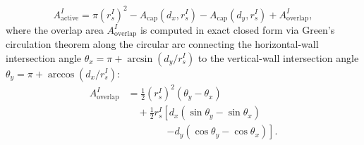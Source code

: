 \documentclass[VANCOUVER,Times1COL]{WileyNJD-v5}
\begin{document}
\begin{enumerate}
\begin{itemize}
                    \begin{equation}
                        A_{\mathrm{active}}^I = \pi (r_s^I)^2 - A_{\mathrm{cap}}(d_x, r_s^I) - A_{\mathrm{cap}}(d_y, r_s^I) + A_{\mathrm{overlap}}^I,
                        \label{eq:eta_interior_corner_overlap}
                    \end{equation}
                    where the overlap area $A_{\mathrm{overlap}}^I$ is computed in exact closed form via Green's circulation theorem along the circular arc connecting the horizontal-wall intersection angle $\theta_x = \pi + \arcsin(d_y / r_s^I)$ to the vertical-wall intersection angle $\theta_y = \pi + \arccos(d_x / r_s^I)$:
                    \begin{align}
                        A_{\mathrm{overlap}}^I & = \frac{1}{2} (r_s^I)^2 (\theta_y - \theta_x) \nonumber                              \\
                                               & \quad + \frac{1}{2} r_s^I \left[ d_x (\sin\theta_y - \sin\theta_x) \right. \nonumber \\
                                               & \qquad \qquad \left. - d_y (\cos\theta_y - \cos\theta_x) \right].
                    \end{align}
          \end{itemize}
\end{enumerate}
\end{document}

